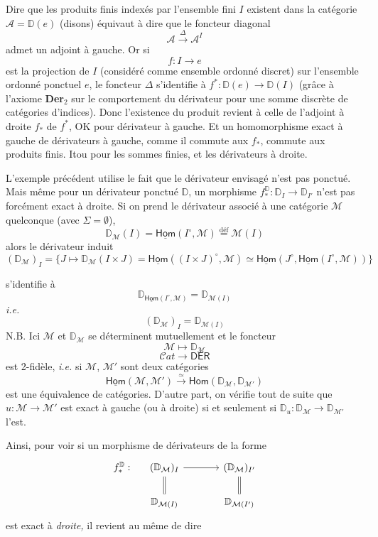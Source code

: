 \documentclass[11pt]{article}
\newcommand{\printedpage}[1]{\marginpar{\footnotesize p.~#1}}
\newcommand{\msp}[1]{\marginpar{\footnotesize [#1]}}
\newcommand{\uHom}{\underline{\mathsf{Hom}}}
\newcommand{\Cat}{\mathcal{C}\mathit{at}}
\newcommand{\D}{\mathbb{D}}
\newcommand{\sHom}{\mathsf{Hom}}
\newcommand{\DER}{\mathsf{DER}}
\begin{document}
\printedpage{18}

\msp{page 26}

Dire que les produits finis indexés par l'ensemble fini $I$ existent dans la catégorie $\mathcal{A} = \D(e)$ (disons) équivaut à dire que le foncteur diagonal
\[
\mathcal{A} \xrightarrow{\Delta} \mathcal{A}^I
\]
admet un adjoint à gauche. Or si
\[
f : I \to e
\]
est la projection de $I$ (considéré comme ensemble ordonné discret) sur l'ensemble ordonné ponctuel $e$, le foncteur $\Delta$ s'identifie à $f^* : \D(e) \to \D(I)$ (grâce à l'axiome \textbf{Der}$_2$ sur le comportement du dérivateur pour une somme discrète de catégories d'indices). Donc l'existence du produit revient à celle de l'adjoint à droite $f_*$ de $f^*$, OK pour dérivateur à gauche. Et un homomorphisme exact à gauche de dérivateurs à gauche, comme il commute aux $f_*$, commute aux produits finis. Itou pour les sommes finies, et les dérivateurs à droite.

L'exemple précédent utilise le fait que le dérivateur envisagé n'est pas ponctué. Mais même pour un dérivateur ponctué $\D$, un morphisme $f^{\D}_* : \D_I \to \D_{I'}$ n'est pas forcément exact à droite. Si on prend le dérivateur associé à une catégorie $\mathcal{M}$ quelconque (avec $\Sigma = \emptyset$),
\[
\D_{\mathcal{M}}(I) = \uHom(I^\circ,\mathcal{M}) \overset{\text{déf}}{=} \mathcal{M}(I)
\]
alors le dérivateur induit
\[
(\D_{\mathcal{M}})_I = \{J \mapsto \D_{\mathcal{M}}(I \times J) = \uHom((I \times J)^\circ,\mathcal{M}) \simeq \uHom(J^\circ,\uHom(I^\circ,\mathcal{M}))\}
\]

\msp{page 27}

s'identifie à
\[
\D_{\uHom(I^\circ,\mathcal{M})} = \D_{\mathcal{M}(I)}
\]
\textit{i.e.}
\[
(\D_{\mathcal{M}})_I = \D_{\mathcal{M}(I)}
\]
N.B. Ici $\mathcal{M}$ et $\D_{\mathcal{M}}$ se déterminent mutuellement et le foncteur
\[
\mathcal{M} \longmapsto \D_{\mathcal{M}}
\]
\[
\Cat \longrightarrow \DER
\]
est 2-fidèle, \textit{i.e.} si $\mathcal{M}$, $\mathcal{M}'$ sont deux catégories
\[
\uHom(\mathcal{M},\mathcal{M}') \xrightarrow{\simeq} \sHom(\D_{\mathcal{M}},\D_{\mathcal{M}'})
\]
est une équivalence de catégories. D'autre part, on vérifie tout de suite que $u : \mathcal{M} \to \mathcal{M}'$ est exact à gauche (ou à droite) si et seulement si $\D_u : \D_{\mathcal{M}} \to \D_{\mathcal{M}'}$ l'est.

Ainsi, pour voir si un morphisme de dérivateurs de la forme
\[
\begin{tikzcd}[column sep=large, row sep=normal]
f^{\D}_* : &[-2.5em] (\D_{\mathcal{M}})_I \arrow[r] \arrow[d, equal] & (\D_{\mathcal{M}})_{I'} \arrow[d, equal] \\
& \D_{\mathcal{M}(I)} & \D_{\mathcal{M}(I')}
\end{tikzcd}
\]
est exact à \textit{droite,} il revient au même de dire
\end{document}
